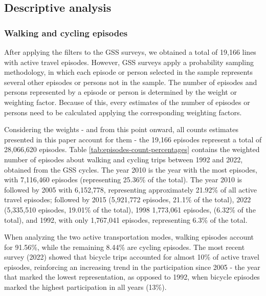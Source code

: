 \documentclass[preprint, 3p,
authoryear]{elsarticle} %
\begin{document}
\subsection{Descriptive analysis}\label{descriptive-analysis}

\subsubsection{Walking and cycling
episodes}\label{walking-and-cycling-episodes}

After applying the filters to the GSS surveys, we obtained a total of
19,166 lines with active travel episodes. However, GSS surveys apply a
probability sampling methodology, in which each episode or person
selected in the sample represents several other episodes or persons not
in the sample. The number of episodes and persons represented by a
episode or person is determined by the weight or weighting factor.
Because of this, every estimates of the number of episodes or persons
need to be calculated applying the corresponding weighting factors.

Considering the weights - and from this point onward, all counts
estimates presented in this paper account for them - the 19,166 episodes
represent a total of 28,066,620 episodes. Table
\ref{tab:episodes-count-percentages} contains the weighted number of
episodes about walking and cycling trips between 1992 and 2022, obtained
from the GSS cycles. The year 2010 is the year with the most episodes,
with 7,116,460 episodes (representing 25.36\% of the total). The year
2010 is followed by 2005 with 6,152,778, representing approximately
21.92\% of all active travel episodes; followed by 2015 (5,921,772
episodes, 21.1\% of the total), 2022 (5,335,510 episodes, 19.01\% of the
total), 1998 1,773,061 episodes, (6.32\% of the total), and 1992, with
only 1,767,041 episodes, representing 6.3\% of the total.

When analyzing the two active transportation modes, walking episodes
account for 91.56\%, while the remaining 8.44\% are cycling episodes.
The most recent survey (2022) showed that bicycle trips accounted for
almost 10\% of active travel episodes, reinforcing an increasing trend
in the participation since 2005 - the year that marked the lowest
representation, as opposed to 1992, when bicycle episodes marked the
highest participation in all years (13\%).

\begingroup\fontsize{8}{10}\selectfont
\end{document}
